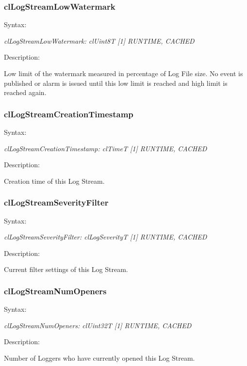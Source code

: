 \begin{flushleft}
\subsubsection{clLogStreamLowWatermark}
\begin{Desc}
\item[Syntax:]
\end{Desc}
\textit{clLogStreamLowWatermark: clUint8T [1] {RUNTIME, CACHED}}
\begin{Desc}
 \item[Description:]
\end{Desc}
Low limit of the watermark measured in percentage of Log File size. No event
is published or alarm is issued until this low limit is reached and high limit is reached again.



\subsubsection{clLogStreamCreationTimestamp}
\begin{Desc}
\item[Syntax:]
\end{Desc}
\textit{clLogStreamCreationTimestamp: clTimeT [1] {RUNTIME, CACHED}}
\begin{Desc}
 \item[Description:]
\end{Desc}
Creation time of this Log Stream.



\subsubsection{clLogStreamSeverityFilter}
\begin{Desc}
\item[Syntax:]
\end{Desc}
\textit{clLogStreamSeverityFilter: clLogSeverityT [1] {RUNTIME, CACHED}}
\begin{Desc}
 \item[Description:]
\end{Desc}
Current filter settings of this Log Stream.


\subsubsection{clLogStreamNumOpeners}
\begin{Desc}
\item[Syntax:]
\end{Desc}
\textit{clLogStreamNumOpeners: clUint32T [1] {RUNTIME, CACHED}}
\begin{Desc}
 \item[Description:]
\end{Desc}
Number of Loggers who have currently opened this Log Stream.



\end{flushleft}

